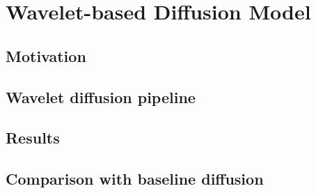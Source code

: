 \chapter{Wavelet-based Diffusion Model}

\section{Motivation}

\section{Wavelet diffusion pipeline}

\section{Results}

\section{Comparison with baseline diffusion}